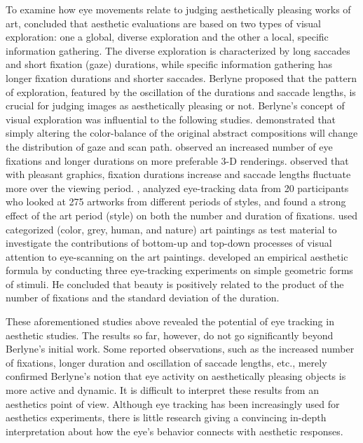 To examine how eye movements relate to judging aesthetically pleasing works of art,  concluded that aesthetic evaluations are based on two types of visual exploration: one a global, diverse exploration and the other a local, specific information gathering.
The diverse exploration is characterized by long saccades and short fixation (gaze) durations, while specific information gathering has longer fixation durations and shorter saccades.
Berlyne proposed that the pattern of exploration, featured by the oscillation of the durations and saccade lengths, is crucial for judging images as aesthetically pleasing or not.
Berlyne's concept of visual exploration was influential to the following studies.
 demonstrated that simply altering the color-balance of the original abstract compositions will change the distribution of gaze and scan path.
 observed an increased number of eye fixations and longer durations on more preferable 3-D renderings.
 observed that with pleasant graphics, fixation durations increase and saccade lengths fluctuate more over the viewing period.
, analyzed eye-tracking data from 20 participants who looked at 275 artworks from different periods of styles, and found a strong effect of the art period (style) on both the number and duration of fixations.
 used categorized (color, grey, human, and nature) art paintings as test material to investigate the contributions of bottom-up and top-down processes of visual attention to eye-scanning on the art paintings.
 developed an empirical aesthetic formula by conducting three eye-tracking experiments on simple geometric forms of stimuli.
He concluded that beauty is positively related to the product of the number of fixations and the standard deviation of the duration.

These aforementioned studies above revealed the potential of eye tracking in aesthetic studies.
The results so far, however, do not go significantly beyond Berlyne's initial work.
Some reported observations, such as the increased number of fixations, longer duration and oscillation of saccade lengths, etc., merely confirmed Berlyne's notion that eye activity on aesthetically pleasing objects is more active and dynamic.
It is difficult to interpret these results from an aesthetics point of view.
Although eye tracking has been increasingly used for aesthetics experiments, there is little research giving a convincing in-depth interpretation about how the eye's behavior connects with aesthetic responses.

